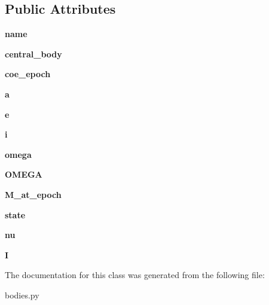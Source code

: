 \subsection*{Public Attributes}
\begin{DoxyCompactItemize}
\item 
\mbox{\label{classbodies_1_1sc_a1cdc7a381633ecb4ce80bf9c617e4e70}} 
{\bfseries name}
\item 
\mbox{\label{classbodies_1_1sc_ab2d6624769de01d1fc5cd6ba0c1e70d8}} 
{\bfseries central\+\_\+body}
\item 
\mbox{\label{classbodies_1_1sc_ae7991e7e261898cef308a0cf6268c5a4}} 
{\bfseries coe\+\_\+epoch}
\item 
\mbox{\label{classbodies_1_1sc_ae4ed113016351ac5b141f9c79d749b0a}} 
{\bfseries a}
\item 
\mbox{\label{classbodies_1_1sc_a1b48011e084f37c028e2763ad1503140}} 
{\bfseries e}
\item 
\mbox{\label{classbodies_1_1sc_a9cbb2b6fc94e235ff67d93e3bdc5792d}} 
{\bfseries i}
\item 
\mbox{\label{classbodies_1_1sc_a99e25c99c1c544bc6a0f4dec259c5e8b}} 
{\bfseries omega}
\item 
\mbox{\label{classbodies_1_1sc_a36d01f4b3844e54b17166500ae3dc1eb}} 
{\bfseries O\+M\+E\+GA}
\item 
\mbox{\label{classbodies_1_1sc_a1c9bdb1e82f0a861f796ed8dce4c5999}} 
{\bfseries M\+\_\+at\+\_\+epoch}
\item 
\mbox{\label{classbodies_1_1sc_aeff25c506593473490de08bc5ea93390}} 
{\bfseries state}
\item 
\mbox{\label{classbodies_1_1sc_a0e8ad3bd5a68ce45a5813c801e3f794f}} 
{\bfseries nu}
\item 
\mbox{\label{classbodies_1_1sc_aa455d316bb7ff67d7ce5547b181137e7}} 
{\bfseries I}
\end{DoxyCompactItemize}


The documentation for this class was generated from the following file\+:\begin{DoxyCompactItemize}
\item 
bodies.\+py\end{DoxyCompactItemize}
